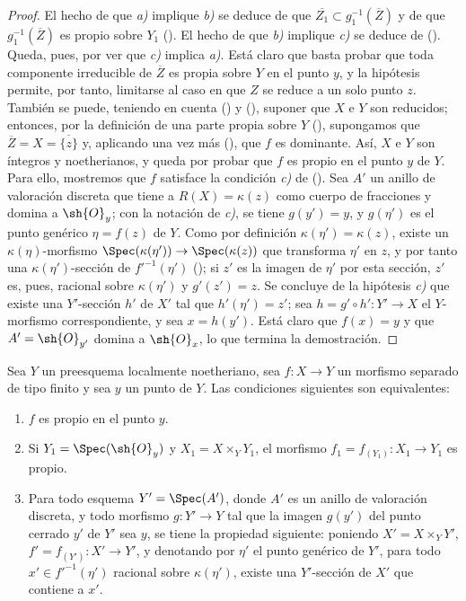 \begin{proof}
El hecho de que \emph{a)} implique \emph{b)} se deduce de que $\overline{Z_1}\subset g_1^{-1}(\overline{Z})$ y de que $g_1^{-1}(\overline{Z})$ es propio sobre $Y_1$ ().
El hecho de que \emph{b)} implique \emph{c)} se deduce de ().
Queda, pues, por ver que \emph{c)} implica \emph{a)}.
Está claro que basta probar que toda componente irreducible de $\overline{Z}$ es propia sobre $Y$ en el punto $y$, y la hipótesis permite, por tanto, limitarse al caso en que $Z$ se reduce a un solo punto $z$.
También se puede, teniendo en cuenta () y (), suponer que $X$ e $Y$ son reducidos; entonces, por la definición de una parte propia sobre $Y$ (), supongamos que $\overline{Z}=X=\overline{\{z\}}$ y, aplicando una vez más (), que $f$ es dominante. Así, $X$ e $Y$ son íntegros y noetherianos, y queda por probar que $f$ es propio en el punto $y$ de $Y$. Para ello, mostremos que $f$ satisface la condición \emph{c)} de ().
Sea $A'$ un anillo de valoración discreta que tiene a $R(X)=\kappa(z)$ como cuerpo de fracciones y domina a $\sh{O}_y$; con la notación de \emph{c)}, se tiene $g(y')=y$, y $g(\eta')$ es el punto genérico $\eta=f(z)$ de $Y$.
Como por definición $\kappa(\eta')=\kappa(z)$, existe un $\kappa(\eta)$-morfismo $\Spec(\kappa(\eta'))\to\Spec(\kappa(z))$ que transforma $\eta'$ en $z$, y por tanto una $\kappa(\eta')$-sección de $f'^{-1}(\eta')$ (); si $z'$ es la imagen de $\eta'$ por esta sección, $z'$ es, pues, racional sobre $\kappa(\eta')$ y $g'(z')=z$.
Se concluye de la hipótesis \emph{c)} que existe una $Y'$-sección $h'$ de $X'$ tal que $h'(\eta')=z'$; sea $h=g'\circ h':Y'\to X$ el $Y$-morfismo correspondiente, y sea $x=h(y')$. Está claro que $f(x)=y$ y que $A'=\sh{O}_{y'}$ domina a $\sh{O}_x$, lo que termina la demostración.
\end{proof}

\begin{corollary}[15.7.5]
\label{IV.15.7.5}
Sea $Y$ un preesquema localmente noetheriano, sea $f:X\to Y$ un morfismo separado de tipo finito y sea $y$ un punto de $Y$.
Las condiciones siguientes son equivalentes:
\begin{enumerate}[label=\emph{\alph*)}]
  \item $f$ es propio en el punto $y$.
  \item Si $Y_1=\Spec(\sh{O}_y)$ y $X_1=X\times_Y Y_1$, el morfismo $f_1=f_{(Y_1)}:X_1\to Y_1$ es propio.
  \item Para todo esquema $Y'=\Spec(A')$, donde $A'$ es un anillo de valoración discreta, y todo morfismo $g:Y'\to Y$ tal que la imagen $g(y')$ del punto cerrado $y'$ de $Y'$ sea $y$, se tiene la propiedad siguiente: poniendo $X'=X\times_Y Y'$, $f'=f_{(Y')}:X'\to Y'$, y denotando por $\eta'$ el punto genérico de $Y'$, para todo $x'\in f'^{-1}(\eta')$ racional sobre $\kappa(\eta')$, existe una $Y'$-sección de $X'$ que contiene a $x'$.
\end{enumerate}
\end{corollary}

